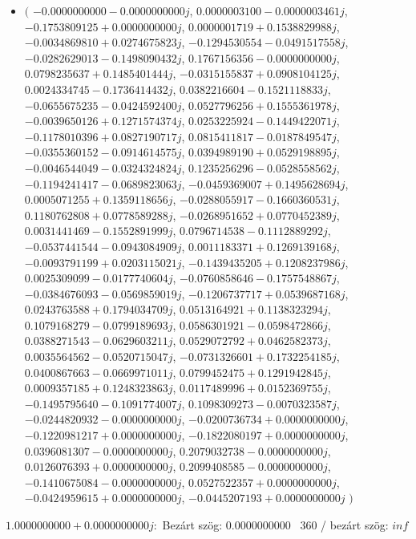 \documentclass[14pt,a4paper]{article}
\begin{document}
\begin{itemize}
\item
$\big($
$-0.0000000000-0.0000000000j$, $0.0000003100-0.0000003461j$, $-0.1753809125+0.0000000000j$, $0.0000001719+0.1538829988j$, $-0.0034869810+0.0274675823j$, $-0.1294530554-0.0491517558j$, $-0.0282629013-0.1498090432j$, $0.1767156356-0.0000000000j$, $0.0798235637+0.1485401444j$, $-0.0315155837+0.0908104125j$, $0.0024334745-0.1736414432j$, $0.0382216604-0.1521118833j$, $-0.0655675235-0.0424592400j$, $0.0527796256+0.1555361978j$, $-0.0039650126+0.1271574374j$, $0.0253225924-0.1449422071j$, $-0.1178010396+0.0827190717j$, $0.0815411817-0.0187849547j$, $-0.0355360152-0.0914614575j$, $0.0394989190+0.0529198895j$, $-0.0046544049-0.0324324824j$, $0.1235256296-0.0528558562j$, $-0.1194241417-0.0689823063j$, $-0.0459369007+0.1495628694j$, $0.0005071255+0.1359118656j$, $-0.0288055917-0.1660360531j$, $0.1180762808+0.0778589288j$, $-0.0268951652+0.0770452389j$, $0.0031441469-0.1552891999j$, $0.0796714538-0.1112889292j$, $-0.0537441544-0.0943084909j$, $0.0011183371+0.1269139168j$, $-0.0093791199+0.0203115021j$, $-0.1439435205+0.1208237986j$, $0.0025309099-0.0177740604j$, $-0.0760858646-0.1757548867j$, $-0.0384676093-0.0569859019j$, $-0.1206737717+0.0539687168j$, $0.0243763588+0.1794034709j$, $0.0513164921+0.1138323294j$, $0.1079168279-0.0799189693j$, $0.0586301921-0.0598472866j$, $0.0388271543-0.0629603211j$, $0.0529072792+0.0462582373j$, $0.0035564562-0.0520715047j$, $-0.0731326601+0.1732254185j$, $0.0400867663-0.0669971011j$, $0.0799452475+0.1291942845j$, $0.0009357185+0.1248323863j$, $0.0117489996+0.0152369755j$, $-0.1495795640-0.1091774007j$, $0.1098309273-0.0070323587j$, $-0.0244820932-0.0000000000j$, $-0.0200736734+0.0000000000j$, $-0.1220981217+0.0000000000j$, $-0.1822080197+0.0000000000j$, $0.0396081307-0.0000000000j$, $0.2079032738-0.0000000000j$, $0.0126076393+0.0000000000j$, $0.2099408585-0.0000000000j$, $-0.1410675084-0.0000000000j$, $0.0527522357+0.0000000000j$, $-0.0424959615+0.0000000000j$, $-0.0445207193+0.0000000000j$
$\big)$
\end{itemize}
$1.0000000000+0.0000000000j$:\
Bezárt szög: $0.0000000000$ \
360 / bezárt szög: $inf$\
\end{document}

